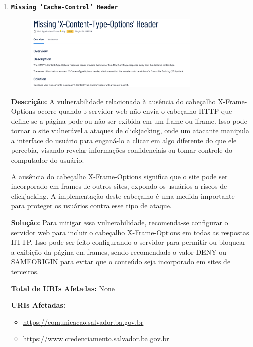 \documentclass[a4paper,12pt]{article}
\begin{document}
\begin{enumerate}
\item \textbf{\texttt{Missing 'Cache-Control' Header}}

                        \begin{figure}[h!]
                        \centering
                        \includegraphics[width=0.8\textwidth]{assets/images-was/Vulnerabilidades Relacionadas a Configurações de Segurança HTTP E TLS/Missing 'X-Content-Type-Options' Header.png}
                        \end{figure}
                        \FloatBarrier
                        \textbf{Descrição:} A vulnerabilidade relacionada à ausência do cabeçalho X-Frame-Options ocorre quando o servidor web não envia o cabeçalho HTTP que define se a página pode ou não ser exibida em um frame ou iframe. Isso pode tornar o site vulnerável a ataques de clickjacking, onde um atacante manipula a interface do usuário para enganá-lo a clicar em algo diferente do que ele percebia, visando revelar informações confidenciais ou tomar controle do computador do usuário.

    A ausência do cabeçalho X-Frame-Options significa que o site pode ser incorporado em frames de outros sites, expondo os usuários a riscos de clickjacking. A implementação deste cabeçalho é uma medida importante para proteger os usuários contra esse tipo de ataque.

\textbf{Solução:} Para mitigar essa vulnerabilidade, recomenda-se configurar o servidor web para incluir o cabeçalho X-Frame-Options em todas as respostas HTTP. Isso pode ser feito configurando o servidor para permitir ou bloquear a exibição da página em frames, sendo recomendado o valor DENY ou SAMEORIGIN para evitar que o conteúdo seja incorporado em sites de terceiros.

\textbf{Total de URIs Afetadas:} None

\textbf{URIs Afetadas:}
\begin{itemize}
    \item \url{https://comunicacao.salvador.ba.gov.br}
    \item \url{https://www.credenciamento.salvador.ba.gov.br}
\end{itemize}


\end{enumerate}
\end{document}
